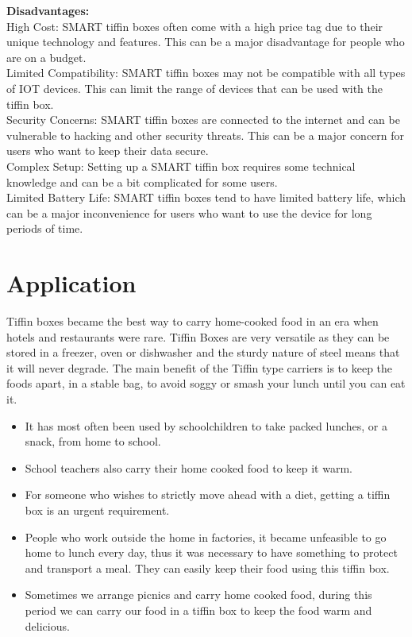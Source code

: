 \documentclass[conference]{IEEEtran}
\begin{document}
\textbf{Disadvantages:\\}
High Cost: SMART tiffin boxes often come with a high price tag due to their unique technology and features. This can be a major disadvantage for people who are on a budget.\\
Limited Compatibility: SMART tiffin boxes may not be compatible with all types of IOT devices. This can limit the range of devices that can be used with the tiffin box.\\
Security Concerns: SMART tiffin boxes are connected to the internet and can be vulnerable to hacking and other security threats. This can be a major concern for users who want to keep their data secure.\\
Complex Setup: Setting up a SMART tiffin box requires some technical knowledge and can be a bit complicated for some users.\\
Limited Battery Life: SMART tiffin boxes tend to have limited battery life, which can be a major inconvenience for users who want to use the device for long periods of time.

\section{Application}
Tiffin boxes became the best way to carry home-cooked food in an era when hotels and restaurants were rare.  Tiffin Boxes are very versatile as they can be stored in a freezer, oven or dishwasher and the sturdy nature of steel means that it will never degrade. The main benefit of the Tiffin type carriers is to keep the foods apart, in a stable bag, to avoid soggy or smash your lunch until you can eat it.

\begin{itemize}
  \item It has most often been used by schoolchildren to take packed lunches, or a snack, from home to school.
  \item School teachers also carry their home cooked food to keep it warm.
  \item For someone who wishes to strictly move ahead with a diet, getting a tiffin box is an urgent requirement.
  \item People who work outside the home in factories, it became unfeasible to go home to lunch every day, thus it was necessary to have something to protect and transport a meal. They can easily keep their food using this tiffin box.
  \item Sometimes we arrange picnics and carry home cooked food, during this period we can carry our food in a tiffin box to keep the food warm and delicious.
  
\end{itemize}
\end{document}
